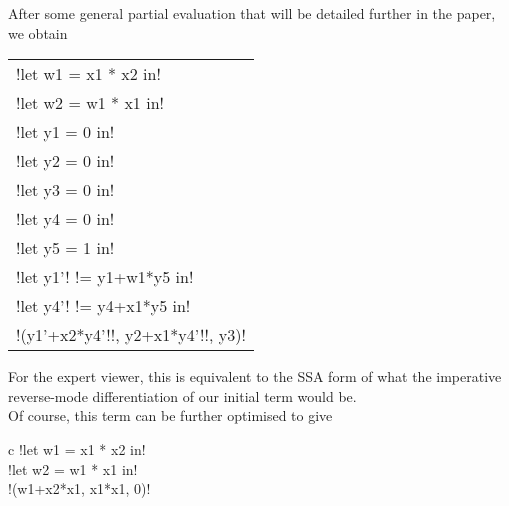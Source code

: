 \begin{example}
After some general partial evaluation that will be detailed further in the paper, we obtain     
        \begin{center}
            \begin{tabular}{l}
                !let w1 = x1 * x2 in!\\ 
                !let w2 = w1 * x1 in!\\
                !let y1 = 0 in!\\
                !let y2 = 0 in!\\
                !let y3 = 0 in!\\
                !let y4 = 0 in!\\
                !let y5 = 1 in!\\
                !let y1'! != y1+w1*y5 in!\\
                !let y4'! != y4+x1*y5 in!\\
                !(y1'+x2*y4'!!, y2+x1*y4'!!, y3)!
            \end{tabular}
        \end{center}  
For the expert viewer, this is equivalent to the SSA form of what the imperative reverse-mode differentiation of our initial term would be.\\
Of course, this term can be further optimised to give
        \begin{center}
            \begin{tabular}{{c}}
                !let w1 = x1 * x2 in!\\ 
                !let w2 = w1 * x1 in!\\
                !(w1+x2*x1, x1*x1, 0)!
            \end{tabular}
        \end{center}
    \end{example}

